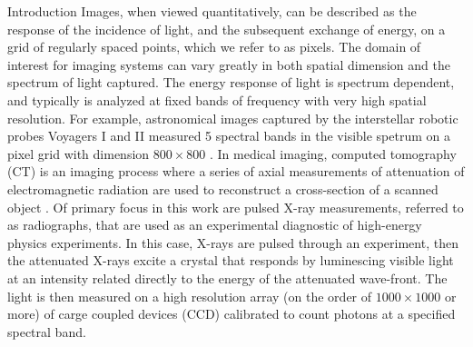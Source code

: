 \begin{chapter}{Introduction}
  Images, when viewed quantitatively, can be described as the response of the incidence of light, and the subsequent exchange of energy, on a grid of regularly spaced points, which we refer to as pixels.
  The domain of interest for imaging systems can vary greatly in both spatial dimension and the spectrum of light captured. 
  The energy response of light is spectrum dependent, and typically is analyzed at fixed bands of frequency with very high spatial resolution.
  For example, astronomical images captured by the interstellar robotic probes Voyagers I and II measured 5 spectral bands in the visible spetrum on a pixel grid with dimension $800 \times 800$ \citep{voyager}.
  In medical imaging, computed tomography (CT) is an imaging process where a series of axial measurements of attenuation of electromagnetic radiation are used to reconstruct a cross-section of a scanned object \citep{epstein2008}.
  Of primary focus in this work are pulsed X-ray measurements, referred to as radiographs, that are used as an experimental diagnostic of high-energy physics experiments.  
  In this case, X-rays are pulsed through an experiment, then the attenuated X-rays excite a crystal that responds by luminescing visible light at an intensity related directly to the energy of the attenuated wave-front.  
  The light is then measured on a high resolution array (on the order of $1000\times1000$ or more) of carge coupled devices (CCD) calibrated to count photons at a specified spectral band.


\end{chapter}
